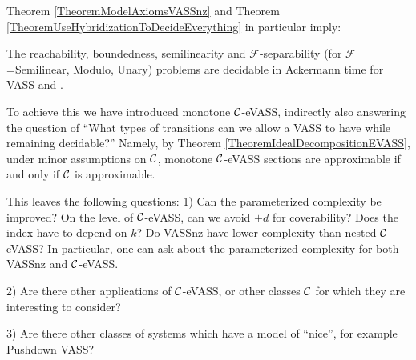 
Theorem \ref{TheoremModelAxiomsVASSnz} and Theorem \ref{TheoremUseHybridizationToDecideEverything} in particular imply:

\begin{corollary}
The reachability, boundedness, semilinearity and \(\mathcal{F}\)-separability (for \(\mathcal{F}\)=Semilinear, Modulo, Unary) problems are decidable in Ackermann time for VASS and \ConsideredModel.
\end{corollary}

To achieve this we have introduced monotone \(\mathcal{C}\)-eVASS, indirectly also answering the question of ``What types of transitions can we allow a VASS to have while remaining decidable?'' Namely, by Theorem \ref{TheoremIdealDecompositionEVASS}, under minor assumptions on \(\mathcal{C}\), monotone \(\mathcal{C}\)-eVASS sections are approximable if and only if \(\mathcal{C}\) is approximable.

This leaves the following questions: 1) Can the parameterized complexity be improved? On the level of \(\mathcal{C}\)-eVASS, can we avoid \(+d\) for coverability? Does the index have to depend on \(k\)? Do VASSnz have lower complexity than nested \(\mathcal{C}\)-eVASS? In particular, one can ask about the parameterized complexity for both VASSnz and \(\mathcal{C}\)-eVASS.

2) Are there other applications of \(\mathcal{C}\)-eVASS, or other classes \(\mathcal{C}\) for which they are interesting to consider?

3) Are there other classes of systems which have a model of ``nice'', for example Pushdown VASS?